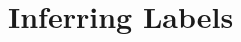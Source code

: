 \documentclass[12pt,a4paper,twoside,openright]{report}
\theoremstyle{definition}
\begin{document}
%
\section{Inferring Labels}
\end{document}
